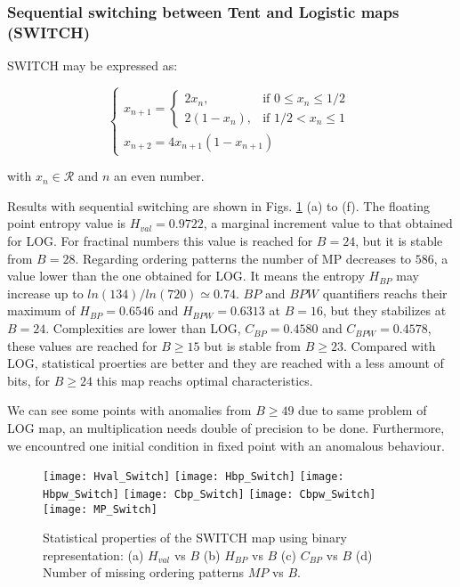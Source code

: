 \subsubsection{Sequential switching between Tent and Logistic maps (SWITCH)} \label{sssec:switch}

SWITCH may be expressed as:

\begin{equation}
\begin{cases}
	x_{n+1}=
	\begin{cases}
		2x_n, & \mbox{if } 0\leq x_n\leq 1/2 \\
		2(1-x_n ), & \mbox{if } 1/2<x_n\leq 1
	\end{cases} \\
	x_{n+2}=4x_{n+1}(1-x_{n+1})
\end{cases}
\end{equation}

with $x_n\in\mathcal{R}$ and $n$ an even number.

Results with sequential switching are shown in Figs. \ref{fig:SWITCH_QuantiB} (a) to (f).
The floating point entropy value is $H_{val}=0.9722$, a marginal increment value to that obtained for LOG. 
For fractinal numbers this value is reached for $B=24$, but it is stable from $B=28$.
Regarding ordering patterns the number of MP decreases to $586$, a value lower than the one obtained for LOG.
It means the entropy $H_{BP}$ may increase up to $ln(134)/ln(720)\simeq 0.74$.
$BP$ and $BPW$ quantifiers reachs their maximum of $H_{BP}=0.6546$ and $H_{BPW}=0.6313$ at $B=16$, but they stabilizes at $B=24$.
Complexities are lower than LOG, $C_{BP}=0.4580$ and $C_{BPW}=0.4578$, these values are reached for $B \geq 15$ but is stable from $B \geq 23$.
Compared with LOG, statistical proerties are better and they are reached with a less amount of bits, for $B \geq 24$ this map reachs optimal characteristics.

We can see some points with anomalies from $B \geq 49$ due to same problem of LOG map, an multiplication needs double of precision to be done.
Furthermore, we encountred one initial condition in fixed point with an anomalous behaviour.

\begin{figure}
	\texttt{[image: Hval\_Switch]}
	\texttt{[image: Hbp\_Switch]}
	\texttt{[image: Hbpw\_Switch]}
	\texttt{[image: Cbp\_Switch]}
	\texttt{[image: Cbpw\_Switch]}
	\texttt{[image: MP\_Switch]}
	\caption{Statistical properties of the SWITCH map using binary representation: (a) $H_{val}$ vs $B$ (b) $H_{BP}$ vs $B$ (c) $C_{BP}$ vs $B$ (d) Number of missing ordering patterns $MP$ vs $B$.}
	\label{fig:SWITCH_QuantiB}
\end{figure}

